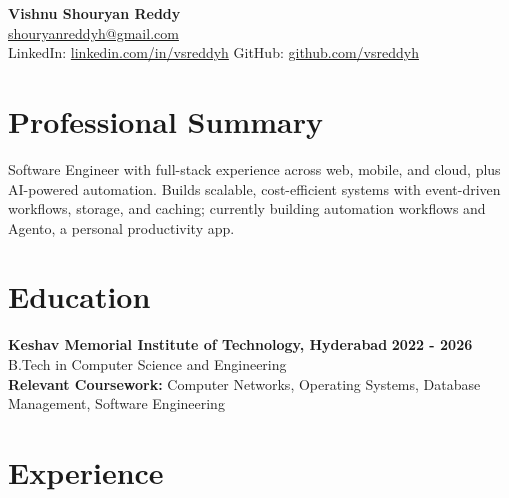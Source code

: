 \documentclass[a4paper,11pt]{article}
\newcommand{\resumeSubheading}[4]{%
  \textbf{#1} \hfill \textbf{#2} \\
{#3} \hfill {#4}
}
\begin{document}
\pagestyle{empty}
\raggedbottom
\addtolength{\textheight}{2\baselineskip}
\small

\begin{center}
  {\LARGE \textbf{Vishnu Shouryan Reddy}}\\[0.3em]
  \href{mailto:shouryanreddyh@gmail.com}{shouryanreddyh@gmail.com} \\[0.3em]
  LinkedIn: \href{https://linkedin.com/in/vsreddyh}{linkedin.com/in/vsreddyh} \textbar{} GitHub: \href{https://github.com/vsreddyh}{github.com/vsreddyh}
\end{center}
\vspace{-0.8em}

\section*{Professional Summary}

Software Engineer with full-stack experience across web, mobile, and cloud, plus AI-powered automation. Builds scalable, cost-efficient systems with event-driven workflows, storage, and caching; currently building automation workflows and Agento, a personal productivity app.

\section*{Education}

\resumeSubheading
{Keshav Memorial Institute of Technology, Hyderabad}{2022 - 2026}
{B.Tech in Computer Science and Engineering}{} \\
\textbf{Relevant Coursework:} Computer Networks, Operating Systems, Database Management, Software Engineering


\section*{Experience}
\end{document}
